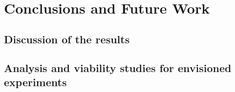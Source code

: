 \chapter{Conclusions and Future Work}

\section{Discussion of the results}
\section{Analysis and viability studies for envisioned experiments}

